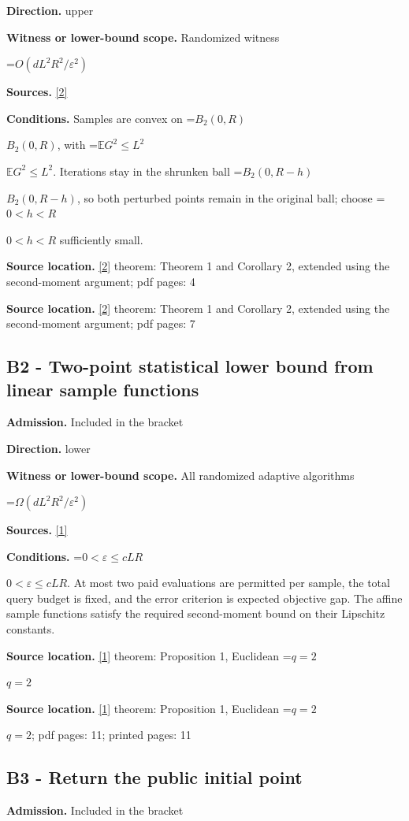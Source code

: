 \documentclass[10pt,a4paper]{article}
\newcommand{\AtlasMath}[1]{\par\begingroup\centering\setbox0=\hbox{$\displaystyle #1$}\ifdim\wd0>1.4\linewidth\typeout{ATLAS WIDE FORMULA: \the\wd0}\fi\ifdim\wd0>\linewidth\resizebox{\linewidth}{!}{\box0}\else\box0\fi\par\endgroup}
\newcommand{\AtlasInlineMath}[1]{\begingroup\setbox0=\hbox{$#1$}\ifdim\wd0>.4\linewidth\endgroup\AtlasMath{#1}\else\endgroup$#1$\fi}
\begin{document}
\textbf{Direction.} upper

\textbf{Witness or lower-bound scope.} Randomized witness

\AtlasMath{O(dL^2R^2/\varepsilon^2)}
\textbf{Sources.} \href{https://jmlr.org/papers/volume18/16-632/16-632.pdf}{[2]}

\textbf{Conditions.} Samples are convex on \AtlasInlineMath{B_2(0,R)}, with \AtlasInlineMath{\mathbb{E} G^2\le L^2}. Iterations stay in the shrunken ball \AtlasInlineMath{B_2(0,R-h)}, so both perturbed points remain in the original ball; choose \AtlasInlineMath{0<h<R} sufficiently small.

\textbf{Source location.} \href{https://jmlr.org/papers/volume18/16-632/16-632.pdf}{[2]} theorem: Theorem 1 and Corollary 2, extended using the second-moment argument; pdf pages: 4

\textbf{Source location.} \href{https://jmlr.org/papers/volume18/16-632/16-632.pdf}{[2]} theorem: Theorem 1 and Corollary 2, extended using the second-moment argument; pdf pages: 7

\subsection{B2 - Two-point statistical lower bound from linear sample functions}
\textbf{Admission.} Included in the bracket

\textbf{Direction.} lower

\textbf{Witness or lower-bound scope.} All randomized adaptive algorithms

\AtlasMath{\Omega(dL^2R^2/\varepsilon^2)}
\textbf{Sources.} \href{https://arxiv.org/html/1312.2139v2}{[1]}

\textbf{Conditions.} \AtlasInlineMath{0<\varepsilon\le cLR}. At most two paid evaluations are permitted per sample, the total query budget is fixed, and the error criterion is expected objective gap. The affine sample functions satisfy the required second-moment bound on their Lipschitz constants.

\textbf{Source location.} \href{https://arxiv.org/html/1312.2139v2}{[1]} theorem: Proposition 1, Euclidean \AtlasInlineMath{q=2}

\textbf{Source location.} \href{https://arxiv.org/html/1312.2139v2}{[1]} theorem: Proposition 1, Euclidean \AtlasInlineMath{q=2}; pdf pages: 11; printed pages: 11

\subsection{B3 - Return the public initial point}
\textbf{Admission.} Included in the bracket
\end{document}
